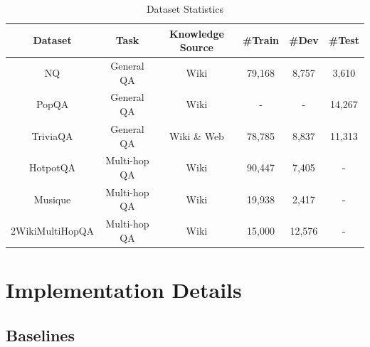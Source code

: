\begin{table}[!h]
\centering
\begin{tabular}{c|c|c|ccc}
\hline
Dataset  & Task         & Knowledge Source & \#Train                                               & \#Dev                                                & \#Test                                           \\ \hline
NQ       & General QA   & Wiki             & 79,168                                                & 8,757                                                & 3,610                                            \\
PopQA    & General QA   & Wiki             & -                                                     & -                                                    & 14,267                                           \\
TriviaQA & General QA   & Wiki \& Web   & 78,785   & 8,837 & 11,313                                           \\
HotpotQA & Multi-hop QA & Wiki             & 90,447                                                & 7,405                                                & -                                                \\
Musique  & Multi-hop QA & Wiki             & 19,938                                                &  2,417 &  - \\
2WikiMultiHopQA    & Multi-hop QA & Wiki             & 15,000                                                & 12,576                                               & -                                                \\ \hline
\end{tabular}
\caption{Dataset Statistics}
\label{tab:dataset}
\end{table}

\section{Implementation Details}
\label{app:implementation}
\subsection{Baselines}
